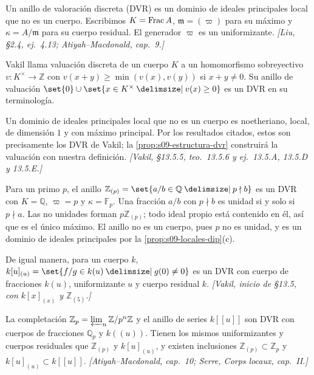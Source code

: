 \begin{defi}
\label{defi:s09-dvr}
Un anillo de valoración discreta (DVR) es un dominio de ideales principales local que no es un cuerpo. Escribimos $K=\operatorname{Frac} A$, $\mathfrak m=(\varpi)$ para su máximo y $\kappa=A/\mathfrak m$ para su cuerpo residual. El generador $\varpi$ es un uniformizante. \emph{[Liu, \S2.4, ej.~4.13; Atiyah--Macdonald, cap.~9.]}
\end{defi}

\begin{obs}
\label{obs:s09-dvr-vakil}
Vakil llama valuación discreta de un cuerpo $K$ a un homomorfismo sobreyectivo $v\colon K^\times\to\mathbb Z$ con $v(x+y)\ge\min(v(x),v(y))$ si $x+y\ne0$. Su anillo de valuación $\set{0}\cup\set{x\in K^\times\given v(x)\ge0}$ es un DVR en su terminología.

Un dominio de ideales principales local que no es un cuerpo es noetheriano, local, de dimensión $1$ y con máximo principal. Por los resultados citados, estos son precisamente los DVR de Vakil; la \cref{prop:s09-estructura-dvr} construirá la valuación con nuestra definición. \emph{[Vakil, \S13.5.5, teo.~13.5.6 y ej.~13.5.A, 13.5.D y 13.5.E.]}
\end{obs}

\begin{ejem}
\label{ejem:s09-dos-dvr}
Para un primo $p$, el anillo $\mathbb Z_{(p)}=\set{a/b\in\mathbb Q\given p\nmid b}$ es un DVR con $K=\mathbb Q$, $\varpi=p$ y $\kappa=\mathbb F_p$. Una fracción $a/b$ con $p\nmid b$ es unidad si y solo si $p\nmid a$. Las no unidades forman $p\mathbb Z_{(p)}$; todo ideal propio está contenido en él, así que es el único máximo. El anillo no es un cuerpo, pues $p$ no es unidad, y es un dominio de ideales principales por la \cref{prop:s09-locales-dip}(c).

De igual manera, para un cuerpo $k$, $k[u]_{(u)}=\set{f/g\in k(u)\given g(0)\ne0}$ es un DVR con cuerpo de fracciones $k(u)$, uniformizante $u$ y cuerpo residual $k$. \emph{[Vakil, inicio de \S13.5, con $k[x]_{(x)}$ y $\mathbb Z_{(5)}$.]}
\end{ejem}

\begin{obs}
\label{obs:s09-dvr-completos}
La completación $\mathbb Z_p=\varprojlim_n\mathbb Z/p^n\mathbb Z$ y el anillo de series $k[[u]]$ son DVR con cuerpos de fracciones $\mathbb Q_p$ y $k((u))$. Tienen los mismos uniformizantes y cuerpos residuales que $\mathbb Z_{(p)}$ y $k[u]_{(u)}$, y existen inclusiones $\mathbb Z_{(p)}\subset\mathbb Z_p$ y $k[u]_{(u)}\subset k[[u]]$. \emph{[Atiyah--Macdonald, cap.~10; Serre, \emph{Corps locaux}, cap.~II.]}
\end{obs}

